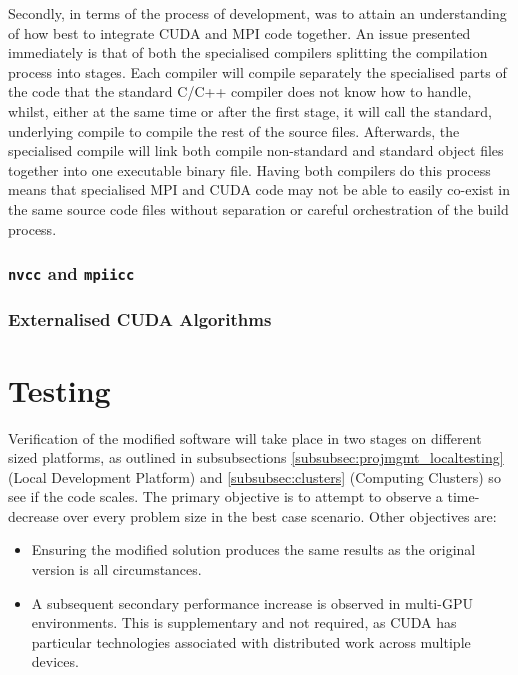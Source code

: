 \documentclass[conference]{IEEEtran}
\begin{document}
Secondly, in terms of the process of development, was to attain an understanding of how best to integrate CUDA and MPI code together. An issue presented immediately is that of both the specialised compilers splitting the compilation process into stages. Each compiler will compile separately the specialised parts of the code that the standard C/C++ compiler does not know how to handle, whilst, either at the same time or after the first stage, it will call the standard, underlying compile to compile the rest of the source files. Afterwards, the specialised compile will link both compile non-standard and standard object files together into one executable binary file. Having both compilers do this process means that specialised MPI and CUDA code may not be able to easily co-exist in the same source code files without separation or careful orchestration of the build process.


\subsubsection{\texttt{nvcc} and \texttt{mpiicc}}


\subsubsection{Externalised CUDA Algorithms}


\section{Testing}
\label{sec:testing}

Verification of the modified software will take place in two stages on different sized platforms, as outlined in subsubsections \ref{subsubsec:projmgmt_localtesting} (Local Development Platform) and \ref{subsubsec:clusters} (Computing Clusters) so see if the code scales. The primary objective is to attempt to observe a time-decrease over every problem size in the best case scenario. Other objectives are:

\begin{itemize}
    \item Ensuring the modified solution produces the same results as the original version is all circumstances.
    \item A subsequent secondary performance increase is observed in multi-GPU environments. This is supplementary and not required, as CUDA has particular technologies associated with distributed work across multiple devices.   
\end{itemize}
\end{document}
